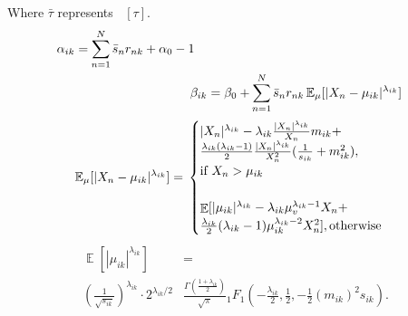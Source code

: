 \documentclass[letterpaper]{article}
\begin{document}
Where $\bar{\tau}$ represents $\mathop{\mathbb{E}_\tau}[\tau]$.
\begin{align}    
    \label{alphak}
        \begin{split}
            \alpha_{ik} &= \sum_{\mathclap{n=1}}^{N} \bar{s}_n r_{nk} + \alpha_0 - 1
        \end{split}
    \\
    \label{betak}
        \beta_{ik} &= \beta_0 + \sum_{\mathclap{n=1}}^{N} \bar{s}_n r_{nk} \mathop{\mathbb{E}_\mu}[|X_n - \mu_{ik}|^{\lambda_{ik}}]
\end{align}
     \[
        \mathop{\mathbb{E}_\mu}[|X_n - \mu_{ik}|^{\lambda_{ik}}]=\\
    \begin{cases}
         |X_n|^{\lambda_{ik}} - \lambda_{ik} \frac{|X_n|^{\lambda_{ik}}}{X_n} m_{ik} + \\
            \frac{\lambda_{ik}(\lambda_{ik} - 1)}{2} \frac{|X_n|^{\lambda_{ik}}}{X_n^2}(\frac{1}{s_{ik}} + m_{ik}^2)     , \\\text{if } X_n > \mu_{ik}&\\ \\
            \mathop{\mathbb{E}}[|\mu_{ik}|^{\lambda_{ik}} - \lambda_{ik} \mu_v^{\lambda_{ik} - 1} X_n + \\ 
            \frac{\lambda_{ik}}{2} (\lambda_{ik} - 1) \mu_{ik}^{\lambda_{ik} - 2} X_n^2],              \text{otherwise}&
        \end{cases}
    \]    
    \begin{equation}
        \begin{split}
            \displaystyle \operatorname {\mathbb{E}} \left[|\mu_{ik}|^{\lambda_{ik}}\right]&=\\
            (\frac{1}{\sqrt{s_{ik}}})^{\lambda_{ik}}\cdot 2^{\lambda_{ik}/2}&{\frac {\Gamma \left({\frac {1+\lambda_{ik}}{2}}\right)}{\sqrt {\pi }}}
            {}_{1}F_{1}\left(-{\frac {\lambda_{ik}}{2}},{\frac {1}{2}},-{\frac {1}{2}}\left({m_{ik}}\right)^{2} s_{ik} \right).  
        \end{split}
    \end{equation}
\end{document}
